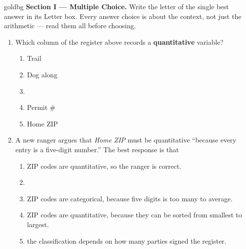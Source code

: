 \vspace{0.14in}

\boxguard[16]
\begin{headlinebox}{goldbg}
\small
\textbf{Section I --- Multiple Choice.} Write the letter of the single best answer in its Letter box. Every answer choice is
about the context, not just the arithmetic --- read them all before choosing.
\end{headlinebox}

\vspace{0.10in}

\begin{enumerate}[leftmargin=1.9em, itemsep=0.14in]

  \item Which column of the register above records a \textbf{quantitative} variable?
        \begin{enumerate}[label=\textbf{(\Alph*)}, leftmargin=2.2em, itemsep=3pt]
          \item Trail
          \item Dog along
          \item {}
          \item Permit \#
          \item Home ZIP
                \hfill{}
        \end{enumerate}

  \boxguard[10]
  \item A new ranger argues that \emph{Home ZIP} must be quantitative ``because every entry is
        a five-digit number.'' The best response is that
        \begin{enumerate}[label=\textbf{(\Alph*)}, leftmargin=2.2em, itemsep=3pt]
          \item ZIP codes are quantitative, so the ranger is correct.
          \item {}
          \item ZIP codes are categorical, because five digits is too many to average.
          \item ZIP codes are quantitative, because they can be sorted from smallest to largest.
          \item the classification depends on how many parties signed the register.
                \hfill{}
        \end{enumerate}


\end{enumerate}
